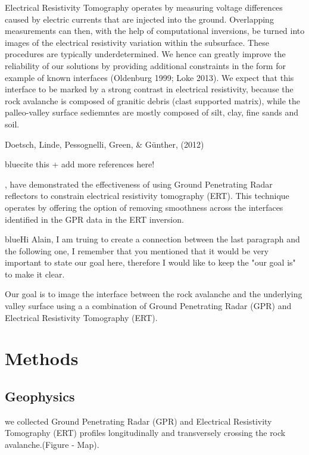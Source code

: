\documentclass[5p]{elsarticle}
\newcommand{\COMON}{\begin{color}{blue}}
\newcommand{\COMOFF}{\end{color}}
\begin{document}
Electrical Resistivity Tomography operates by measuring voltage differences caused by electric currents that are injected into the ground. Overlapping measurements can then, with the help of computational inversions, be turned into images of the electrical resistivity variation within the subsurface. These procedures are typically underdetermined. We hence can greatly improve the reliability of our solutions by providing additional constraints in the form for example of known interfaces (Oldenburg 1999; Loke 2013). We expect that this interface to be marked by a strong contrast in electrical resistivity, because the rock avalanche is composed of granitic debris (clast supported matrix), while the palleo-valley surface sediemntes are mostly composed of silt, clay, fine sands and soil. 

Doetsch, Linde, Pessognelli, Green, & Günther, (2012) \COMON cite this + add more references here! \COMOFF, have demonstrated the effectiveness of using Ground Penetrating Radar reflectors to constrain electrical resistivity tomography (ERT). This technique operates by offering the option of removing smoothness across the interfaces identified in the GPR data in the ERT inversion.  

\COMON Hi Alain, I am truing to create a connection between the last paragraph and the following one, I remember that you mentioned that it would be very important to state our goal here, therefore I would like to keep the "our goal is" to make it clear. \COMOFF

Our goal is to image the interface between the rock avalanche and the underlying valley surface using a a combination of Ground Penetrating Radar (GPR) and Electrical Resistivity Tomography (ERT).


\bigskip   





\section{Methods}

\subsection{Geophysics}


we collected Ground Penetrating Radar (GPR) and  Electrical Resistivity Tomography (ERT) profiles longitudinally and transversely crossing the rock avalanche.(Figure - Map). 
\end{document}
